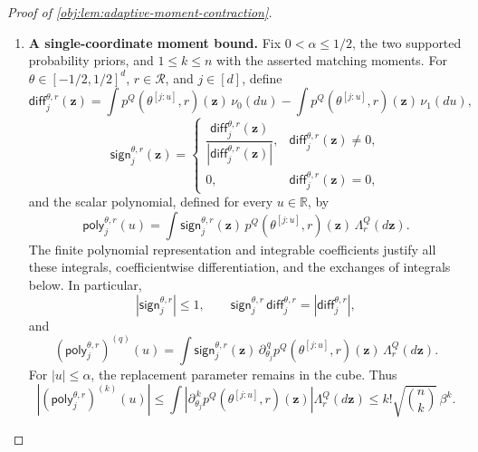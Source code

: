\begin{proof}[Proof of \cref{obj:lem:adaptive-moment-contraction}]
\begin{enumerate}
\item \textbf{A single-coordinate moment bound.}
Fix \(0<\alpha\le1/2\), the two supported probability priors, and
\(1\le k\le n\) with the asserted matching moments. For
\(\theta\in[-1/2,1/2]^d\), \(r\in\mathcal R\), and \(j\in[d]\), define
\[
\mathsf{diff}^{\theta,r}_j(\mathbf z)
=
\int p^Q(\theta^{[j:u]},r)(\mathbf z)\,\nu_0(du)
-\int p^Q(\theta^{[j:u]},r)(\mathbf z)\,\nu_1(du),
\]
\[
\mathsf{sign}^{\theta,r}_j(\mathbf z)
=
\begin{cases}
\dfrac{\mathsf{diff}^{\theta,r}_j(\mathbf z)}
      {|\mathsf{diff}^{\theta,r}_j(\mathbf z)|},
 &\mathsf{diff}^{\theta,r}_j(\mathbf z)\ne0,\\[6pt]
0,&\mathsf{diff}^{\theta,r}_j(\mathbf z)=0,
\end{cases}
\]
and the scalar polynomial, defined for every \(u\in\mathbb R\), by
\[
\mathsf{poly}^{\theta,r}_j(u)
=
\int
 \mathsf{sign}^{\theta,r}_j(\mathbf z)\,
 p^Q(\theta^{[j:u]},r)(\mathbf z)\,
 \Lambda_r^Q(d\mathbf z).
\]
The finite polynomial representation and integrable coefficients justify all these integrals, coefficientwise differentiation, and the exchanges of integrals below. In particular,
\[
|\mathsf{sign}^{\theta,r}_j|\le1,
\qquad
\mathsf{sign}^{\theta,r}_j\,\mathsf{diff}^{\theta,r}_j
=|\mathsf{diff}^{\theta,r}_j|,
\]
and
\[
\left(\mathsf{poly}^{\theta,r}_j\right)^{(q)}(u)
=
\int
 \mathsf{sign}^{\theta,r}_j(\mathbf z)\,
 \partial_{\theta_j}^{\,q}p^Q(\theta^{[j:u]},r)(\mathbf z)\,
 \Lambda_r^Q(d\mathbf z).
\]
For \(|u|\le\alpha\), the replacement parameter remains in the cube. Thus
\[
\left|
 \left(\mathsf{poly}^{\theta,r}_j\right)^{(k)}(u)
\right|
\le
\int
 \left|\partial_{\theta_j}^{\,k}
 p^Q(\theta^{[j:u]},r)(\mathbf z)\right|
 \Lambda_r^Q(d\mathbf z)
\le k!\sqrt{\binom nk}\,\beta^k.
\]


\end{enumerate}
\end{proof}
